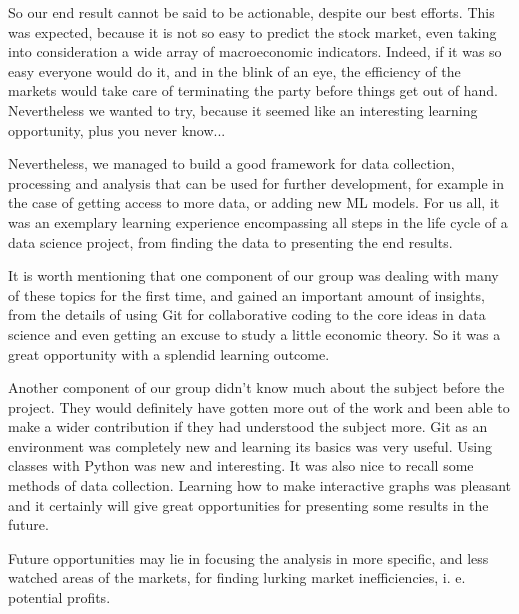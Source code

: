 \documentclass[10pt]{article} %
\begin{document}
So our end result cannot be said to be actionable, despite our best efforts. This was expected, because it is not so easy to predict the stock market, even taking into consideration a wide array of macroeconomic indicators. Indeed, if it was so easy everyone would do it, and in the blink of an eye, the efficiency of the markets would take care of terminating the party before things get out of hand. Nevertheless we wanted to try, because it seemed like an interesting learning opportunity, plus you never know...

Nevertheless, we managed to build a good framework for data collection, processing and analysis that can be used for further development, for example in the case of getting access to more data, or adding new ML models. For us all, it was an exemplary learning experience encompassing all steps in the life cycle of a data science project, from finding the data to presenting the end results.

It is worth mentioning that one component of our group was dealing with many of these topics for the first time, and gained an important amount of insights, from the details of using Git for collaborative coding to the core ideas in data science and even getting an excuse to study a little economic theory. So it was a great opportunity with a splendid learning outcome.

Another component of our group didn't know much about the subject before the project. They would definitely have gotten more out of the work and been able to make a wider contribution if they had understood the subject more. Git as an environment was completely new and learning its basics was very useful. Using classes with Python was new and interesting. It was also nice to recall some methods of data collection. Learning how to make interactive graphs was pleasant and it certainly will give great opportunities for presenting some results in the future.

Future opportunities may lie in focusing the analysis in more specific, and less watched areas of the markets, for finding lurking market inefficiencies, i. e. potential profits.
\end{document}
